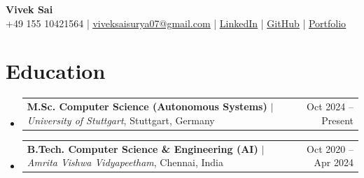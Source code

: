 \documentclass[A4,10.5pt]{article}
\makeatletter
\newcommand{\CVEduItem}[4]{
  \vspace{-2pt}\item
    \begin{tabular*}{0.97\textwidth}[t]{l@{\extracolsep{\fill}}r}
      \textbf{#1} $|$ \small\textit{#3}, #4 & \small\textcolor{datecolor}{#2} \\
    \end{tabular*}\vspace{-15pt}
}
\newcommand{\CVSubHeadingListStart}{\begin{itemize}[leftmargin=0.5cm, label={}]}
\newcommand{\CVSubHeadingListEnd}{\end{itemize}}
\makeatother
\begin{document}
\begin{center}
    \textbf{\huge Vivek Sai} \\ \vspace{2pt}
    \small
    +49 155 10421564 \;|\;
    \href{mailto:viveksaisurya07@gmail.com}{\underline{viveksaisurya07@gmail.com}} \;|\;
    \href{https://www.linkedin.com/in/vivek-sai-5b363221a/}{\underline{LinkedIn}} \;|\;
    \href{https://github.com/VivekSai07}{\underline{GitHub}} \;|\;
    \href{https://vivek-portfolio-mocha.vercel.app/}{\underline{Portfolio}}
\end{center}

\vspace{-8pt}

\section{Education}
  \CVSubHeadingListStart
    \CVEduItem{M.Sc. Computer Science (Autonomous Systems)}{Oct 2024 -- Present}{University of Stuttgart}{Stuttgart, Germany}
    \CVEduItem{B.Tech. Computer Science \& Engineering (AI)}{Oct 2020 -- Apr 2024}{Amrita Vishwa Vidyapeetham}{Chennai, India}
  \CVSubHeadingListEnd

\vspace{4pt}
\end{document}
